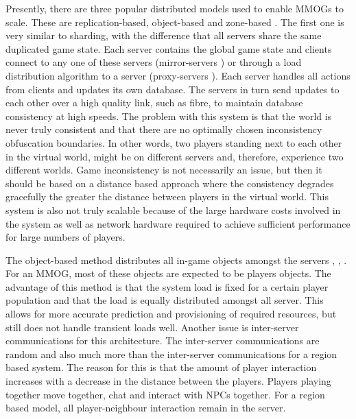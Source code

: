 \documentclass[journal,oneside,a4paper,onecolumn]{IEEEtran}
\begin{document}
Presently, there are three popular distributed models used to enable MMOGs to scale. These are replication-based, object-based and zone-based \cite{Hu_voronoi_IM}. The first one is very similar to sharding, with the difference that all servers share the same duplicated game state. Each server contains the global game state and clients connect to any one of these servers (mirror-servers \cite{mirrored_server}) or through a load distribution algorithm to a server (proxy-servers \cite{proxy_server_dist}). Each server handles all actions from clients and updates its own database. The servers in turn send updates to each other over a high quality link, such as fibre, to maintain database consistency at high speeds. The problem with this system is that the world is never truly consistent and that there are no optimally chosen inconsistency obfuscation boundaries. In other words, two players standing next to each other in the virtual world, might be on different servers and, therefore, experience two different worlds. Game inconsistency is not necessarily an issue, but then it should be based on a distance based approach where the consistency degrades gracefully the greater the distance between players in the virtual world. This system is also not truly scalable because of the large hardware costs involved in the system as well as network hardware required to achieve sufficient performance for large numbers of players.

The object-based method distributes all in-game objects amongst the servers \cite{object_based_consistency1}, \cite{object_based_consistency2}, \cite{object_based_consistency3}. For an MMOG, most of these objects are expected to be players objects. The advantage of this method is that the system load is fixed for a certain player population and that the load is equally distributed amongst all server. This allows for more accurate prediction and provisioning  of required resources, but still does not handle transient loads well. Another issue is inter-server communications for this architecture. The inter-server communications are random and also much more than the inter-server communications for a region based system. The reason for this is that the amount of player interaction increases with a decrease in the distance between the players. Players playing together move together, chat and interact with \acp{NPC} together. For a region based model, all player-neighbour interaction remain in the server.
\end{document}
